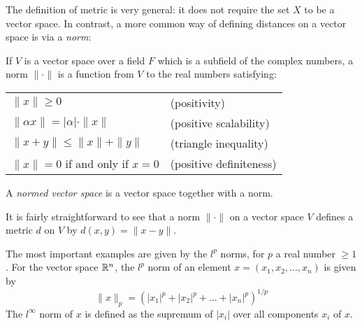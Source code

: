The definition of metric is very general: it does not require the set $X$ to be a vector space. In contrast, a more common way of defining distances on a vector space is via a \emph{norm}:
\begin{defn}[Norm]
If $V$ is a vector space over a field $F$ which is a subfield of the complex numbers, a norm $\|\cdot\|$ is a function from $V$ to the real numbers satisfying:
\begin{center}
\begin{tabular}{ll}
$\|x\| \ge 0$ & (positivity)\\
$\|\alpha x\| = |\alpha|\cdot\|x\|$ & (positive scalability)\\
$\|x + y\| \le \|x\| + \|y\|$ & (triangle inequality)\\
$\|x\| = 0$ if and only if $x = 0$ & (positive definiteness)
\end{tabular}
\end{center}
A \emph{normed vector space} is a vector space together with a norm.
\end{defn}
It is fairly straightforward to see that a norm $\|\cdot\|$ on a vector space $V$ defines a metric $d$ on $V$ by $d(x,y) = \|x - y\|$.

\begin{defn}[$l^p$ Norms]
The most important examples are given by the $l^p$ norms, for $p$ a real number $\ge 1$. For the vector space $\mathbb{R}^n$, the $l^p$ norm of an element $x = (x_1,x_2,\ldots,x_n)$ is given by
$$\|x\|_p = \left(|x_1|^p + |x_2|^p + \ldots + |x_n|^p\right)^{1/p}$$
The $l^\infty$ norm of $x$ is defined as the supremum of $|x_i|$ over all components $x_i$ of $x$.
\end{defn}

